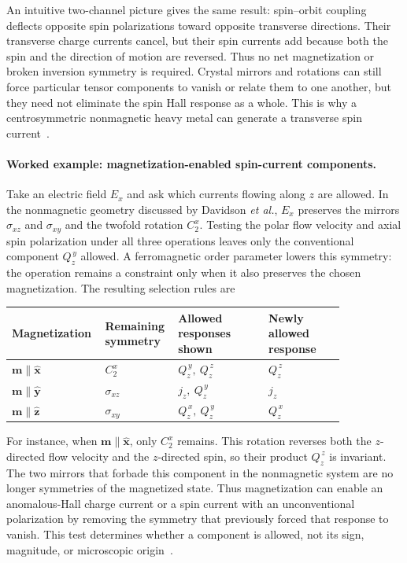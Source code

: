 An intuitive two-channel picture gives the same result: spin--orbit coupling
deflects opposite spin polarizations toward opposite transverse directions.
Their transverse charge currents cancel, but their spin currents add because
both the spin and the direction of motion are reversed.  Thus no net
magnetization or broken inversion symmetry is required.  Crystal mirrors and
rotations can still force particular tensor components to vanish or relate
them to one another, but they need not eliminate the spin Hall response as a
whole.  This is why a centrosymmetric nonmagnetic heavy metal can generate a
transverse spin current~\cite{sot-stt-compact-model,liu2012ta-spin-hall,
    pai2012w-spin-hall,davidson2020spin-currents}.

\paragraph{Worked example: magnetization-enabled spin-current components.}
Take an electric field $E_x$ and ask which currents flowing along $z$ are
allowed.  In the nonmagnetic geometry discussed by Davidson \emph{et al.},
$E_x$ preserves the mirrors $\sigma_{xz}$ and $\sigma_{xy}$ and the twofold
rotation $C_2^x$.  Testing the polar flow velocity and axial spin polarization
under all three operations leaves only the conventional component
$Q_z^{\,y}$ allowed.  A ferromagnetic order parameter lowers this symmetry:
the operation remains a constraint only when it also preserves the chosen
magnetization.  The resulting selection rules are
\begin{center}
    \small
    \begin{tabular}{|p{0.19\linewidth}|p{0.17\linewidth}|p{0.26\linewidth}|p{0.22\linewidth}|}
        \hline
        Magnetization & Remaining symmetry & Allowed responses shown
        & Newly allowed response \\
        \hline
        $\mathbf{m}\parallel\hat{\mathbf{x}}$ & $C_2^x$
        & $Q_z^{\,y},\ Q_z^{\,z}$ & $Q_z^{\,z}$ \\
        \hline
        $\mathbf{m}\parallel\hat{\mathbf{y}}$ & $\sigma_{xz}$
        & $j_z,\ Q_z^{\,y}$ & $j_z$ \\
        \hline
        $\mathbf{m}\parallel\hat{\mathbf{z}}$ & $\sigma_{xy}$
        & $Q_z^{\,x},\ Q_z^{\,y}$ & $Q_z^{\,x}$ \\
        \hline
    \end{tabular}
\end{center}
For instance, when $\mathbf{m}\parallel\hat{\mathbf{x}}$, only $C_2^x$
remains.  This rotation reverses both the $z$-directed flow velocity and the
$z$-directed spin, so their product $Q_z^{\,z}$ is invariant.  The two mirrors
that forbade this component in the nonmagnetic system are no longer symmetries
of the magnetized state.
Thus magnetization can enable an anomalous-Hall charge current or a spin
current with an unconventional polarization by removing the symmetry that
previously forced that response to vanish.  This test determines whether a
component is allowed, not its sign, magnitude, or microscopic
origin~\cite{davidson2020spin-currents}.

